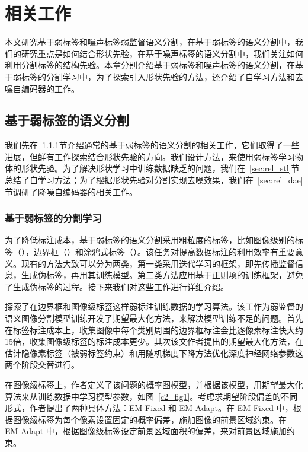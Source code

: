 \chapter{相关工作}
本文研究基于弱标签和噪声标签弱监督语义分割，在基于弱标签的语义分割中，我们的研究重点是如何结合形状先验，在基于噪声标签的语义分割中，我们关注如何利用分割标签的结构先验。本章分别介绍基于弱标签和噪声标签的语义分割，在基于弱标签的分割学习中，为了探索引入形状先验的方法，还介绍了自学习方法和去噪自编码器的工作。

\section{基于弱标签的语义分割}

我们先在~\ref{sec:rel_wss}节介绍通常的基于弱标签的语义分割的相关工作，它们取得了一些进展，但鲜有工作探索结合形状先验的方向。我们设计方法，来使用弱标签学习物体的形状先验。为了解决形状学习中训练数据缺乏的问题，我们在~\ref{sec:rel_stl}节总结了自学习方法；为了根据形状先验对分割实现去噪效果，我们在~\ref{sec:rel_dae}节调研了降噪自编码器的相关工作。

\subsection{基于弱标签的分割学习} \label{sec:rel_wss}

为了降低标注成本，基于弱标签的语义分割采用粗粒度的标签，比如图像级别的标签（\cite{wang2020self,fan2020learning,chang2020weakly}），边界框（\cite{papandreou2015weakly,khoreva2017simple,song2019box}）和涂鸦式标签（\cite{lin2016scribblesup,vernaza2017learning,tang2018regularized}）。该任务对提高数据标注的利用效率有重要意义。现有的方法大致可以分为两类，第一类采用迭代学习的框架，即先传播监督信息，生成伪标签，再用其训练模型。第二类方法应用基于正则项的训练框架，避免了生成伪标签的过程。接下来我们对这些工作进行详细介绍。


\citet{papandreou2015weakly}探索了在边界框和图像级标签这样弱标注训练数据的学习算法。该工作为弱监督的语义图像分割模型训练开发了期望最大化方法，来解决模型训练不足的问题。首先在标签标注成本上，收集图像中每个类别周围的边界框标注会比逐像素标注快大约15倍\citep{lin2014microsoft}，收集图像级标签的标注成本更少。其次该文作者提出的期望最大化方法，在估计隐像素标签（被弱标签约束）和用随机梯度下降方法优化深度神经网络参数这两个阶段交替进行。

在图像级标签上，作者定义了该问题的概率图模型，并根据该模型，用期望最大化算法来从训练数据中学习模型参数，如图~\ref{c2_fig1}。考虑求期望阶段偏差的不同形式，作者提出了两种具体方法：EM-Fixed 和 EM-Adapt。在 EM-Fixed 中，根据图像级标签为每个像素设置固定的概率偏差，施加图像的前景区域约束。在 EM-Adapt 中，根据图像级标签设定前景区域面积的偏差，来对前景区域施加约束。

